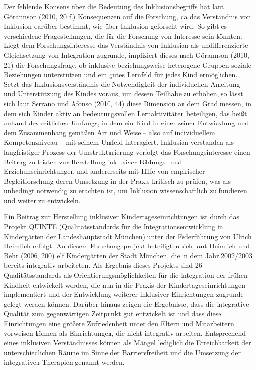 Der fehlende Konsens über die Bedeutung des Inklusionsbegriffs hat laut Görannson (2010, 20 f.) Konsequenzen auf die Forschung, da das Verständnis von Inklusion darüber bestimmt, wie über Inklusion geforscht wird. So gibt es verschiedene Fragestellungen, die für die Forschung von Interesse sein könnten. Liegt dem Forschungsinteresse das Verständnis von Inklusion als undifferenzierte Gleichsetzung von Integration zugrunde, impliziert dieses nach Görannson (2010, 21) die Forschungsfrage, ob inklusive beziehungsweise heterogene Gruppen soziale Beziehungen unterstützen und ein gutes Lernfeld für jedes Kind ermöglichen. Setzt das Inklusionsverständnis die Notwendigkeit der individuellen Anleitung und Unterstützung des Kindes voraus, um dessen Teilhabe zu erhöhen, so lässt sich laut Serrano und Afonso (2010, 44) diese Dimension an dem Grad messen, in dem sich Kinder aktiv an bedeutungsvollen Lernaktivitäten beteiligen, das heißt anhand des zeitlichen Umfangs, in dem ein Kind in einer seiner Entwicklung und dem Zusammenhang gemäßen Art und Weise -- also auf individuellem Kompetenzniveau -- mit seinem Umfeld interagiert.
Inklusion verstanden als langfristiger Prozess der Umstrukturierung verfolgt das Forschungsinteresse einen Beitrag zu leisten zur Herstellung inklusiver Bildungs- und Erziehunseinrichtungen und  andererseits mit Hilfe von empirischer Begleitforschung deren Umsetzung in der Praxis kritisch zu prüfen, was als unbedingt notwendig zu erachten ist, um Inklusion wissenschaftlich zu fundieren und weiter zu entwickeln.

Ein Beitrag zur Herstellung inklusiver Kindertageseinrichtungen ist durch das Projekt QUINTE (Qualitätsstandards für die Integrationsentwicklung in Kindergärten der Landeshauptstadt München) unter der Federführung von Ulrich Heimlich erfolgt. An diesem Forschungsprojekt beteiligten sich laut Heimlich und Behr (2006, 200) elf Kindergärten der Stadt München, die in dem Jahr 2002/2003 bereits integrativ arbeiteten. Als Ergebnis dieses Projekts sind 26 Qualitätsstandards als Orientierungsmöglichkeiten für die Integration der frühen Kindheit entwickelt worden, die nun in die Praxis der Kindertageseinrichtungen implementiert und der Entwicklung weiterer inklusiver Einrichtungen zugrunde gelegt werden können. 
Darüber hinaus zeigen die Ergebnisse, dass die integrative Qualität zum gegenwärtigen Zeitpunkt gut entwickelt ist und dass diese Einrichtungen eine größere Zufriedenheit unter den Eltern und Mitarbeitern vorweisen können als Einrichtungen, die nicht integrativ arbeiten. Entsprechend eines inklusiven Verständnisses können als Mängel lediglich die Erreichbarkeit der unterschiedlichen Räume im Sinne der Barrierefreiheit und die Umsetzung der integrativen Therapien genannt werden.  

